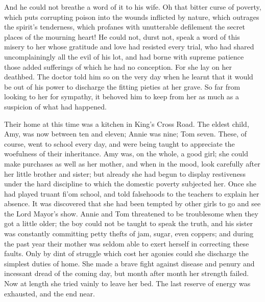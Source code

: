 And he could not breathe a word of it to his wife. Oh that bitter curse
of poverty, which puts corrupting poison into the wounds inflicted by
nature, which outrages the spirit's tenderness, which profanes with
unutterable defilement the secret places of the mourning heart! He could
not, durst not, speak a word of this misery to her whose gratitude and
love had resisted every trial, who had shared uncomplainingly all the
evil of his lot, and had borne with supreme patience those added
sufferings of which he had no conception. For she lay on her deathbed.
The doctor told him so on the very day when he learnt that it would be
out of his power to discharge the fitting pieties at her grave. So far
from looking to her for sympathy, it behoved him to keep from her as
much as a suspicion of what had happened.

Their home at this time was a kitchen in King's Cross Road. The eldest
child, Amy, was now between ten and eleven; Annie was
{\protect\hypertarget{161}{}{}}nine; Tom seven. These, of course, went
to school every day, and were being taught to appreciate the woefulness
of their inheritance. Amy was, on the whole, a good girl; she could make
purchases as well as her mother, and when in the mood, look carefully
after her little brother and sister; but already she had begun to
display restiveness under the hard discipline to which the domestic
poverty subjected her. Once she had played truant fi'om school, and told
falsehoods to the teachers to explain her absence. It was discovered
that she had been tempted by other girls to go and see the Lord Mayor's
show. Annie and Tom threatened to be troublesome when they got a little
older; the boy could not be taught to speak the truth, and his sister
was constantly committing petty thefts of jam, sugar, even coppers; and
during the past year their mother was seldom able to exert herself in
correcting these faults. Only by dint of struggle which cost her agonies
could she discharge the simplest duties of home. She made a brave fight
against disease and penury {\protect\hypertarget{162}{}{}}and incessant
dread of the coming day, but month after month her strength failed. Now
at length she tried vainly to leave her bed. The last reserve of energy
was exhausted, and the end near.

